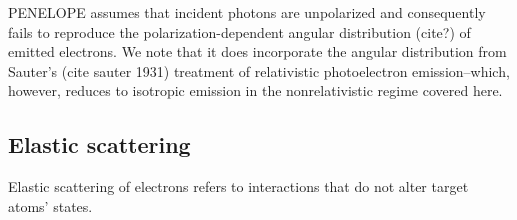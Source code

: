 \documentclass [11pt, proquest, article] {uwthesis}[2016/11/22]
\begin{document}
PENELOPE assumes that incident photons are unpolarized and consequently fails to reproduce the polarization-dependent angular distribution (cite?) of emitted electrons. 
We note that it does incorporate the angular distribution from Sauter's (cite sauter 1931) treatment of relativistic photoelectron emission--which, however, reduces to isotropic emission in the nonrelativistic regime covered here.



\subsection{Elastic scattering}
Elastic scattering of electrons refers to interactions that do not alter target atoms' states. 
%

%


%
%
\end{document}
